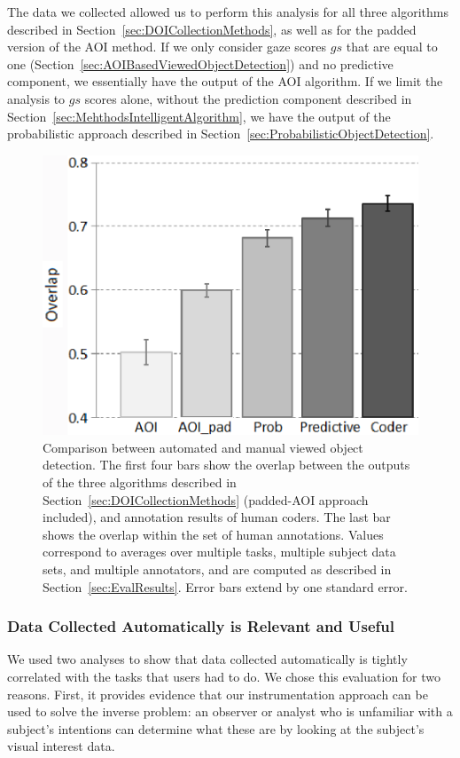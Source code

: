 The data we collected allowed us to perform this analysis for all three algorithms described in Section~\ref{sec:DOICollectionMethods}, as well as for the padded version of the AOI method. If we only consider gaze scores $gs$ that are equal to one (Section~\ref{sec:AOIBasedViewedObjectDetection}) and no predictive component, we essentially have the output of the AOI algorithm. If we limit the analysis to $gs$ scores alone, without the prediction component described in Section~\ref{sec:MehthodsIntelligentAlgorithm}, we have the output of the probabilistic approach described in Section~\ref{sec:ProbabilisticObjectDetection}.

\begin{figure}[htb]
  \centering
  \includegraphics[width=0.8\linewidth]{images/algosComparison.eps}
  \caption{Comparison between automated and manual viewed object detection.
The first four bars show the overlap between the outputs of
the three algorithms described in Section~\ref{sec:DOICollectionMethods} (padded-AOI approach included), and
annotation results of human coders. The last bar shows the overlap
within the set of human annotations. Values correspond to averages
over multiple tasks, multiple subject data sets, and multiple annotators,
and are computed as described in Section~\ref{sec:EvalResults}. Error bars
extend by one standard error. }
	\label{fig:quantitative}
\end{figure}


\subsubsection{Data Collected Automatically is Relevant and Useful}
\label{sec:EvalDataCollected}

We used two analyses to show that data collected automatically is tightly correlated with the tasks that users had to do. We chose this evaluation for two reasons. First, it provides evidence that our instrumentation approach can be used to solve the inverse problem: an observer or analyst who is unfamiliar with a subject's intentions can determine what these are by looking at the subject's visual interest data. 

